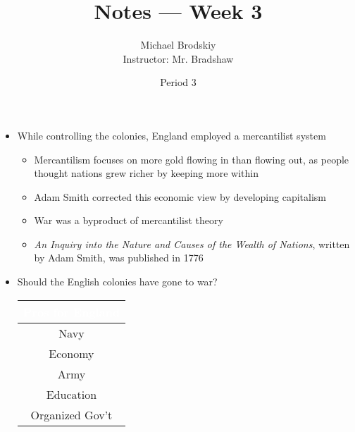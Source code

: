 \documentclass[12pt]{article}
\title{Notes — Week 3}
\date{Period 3}
\author{Michael Brodskiy\\ \small Instructor: Mr. Bradshaw}
\begin{document}
\maketitle

\begin{itemize}

  \item While controlling the colonies, England employed a mercantilist system

    \begin{itemize}

      \item Mercantilism focuses on more gold flowing in than flowing out, as people thought nations grew richer by keeping more within

      \item Adam Smith corrected this economic view by developing capitalism

      \item War was a byproduct of mercantilist theory

      \item \textit{An Inquiry into the Nature and Causes of the Wealth of Nations}, written by Adam Smith, was published in 1776

    \end{itemize}

  \item Should the English colonies have gone to war?

    \begin{center}
      \begin{tabular}{| c |}
        \hline
        \rowcolor{BurntOrange} \textcolor{white}{Pros for England}\\
        \hline
        Navy\\
        \rowcolor{Gray!50} Economy\\
        Army\\
        \rowcolor{Gray!50} Education\\
        Organized Gov't\\
        \hline
      \end{tabular}
    \end{center}


\end{itemize}
\end{document}
